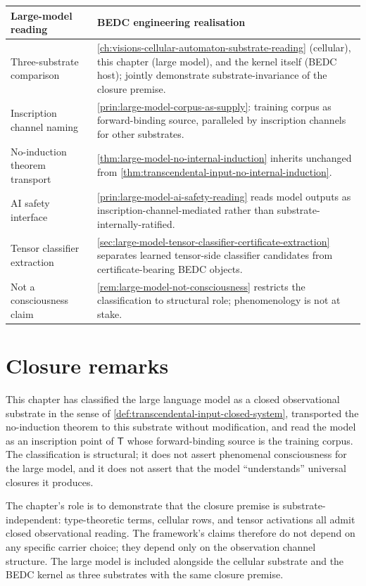 \begin{longtable}{p{}p{}}
\toprule
\textbf{Large-model reading} & \textbf{BEDC engineering realisation} \\
\midrule
Three-substrate comparison &
\autoref{ch:visions-cellular-automaton-substrate-reading} (cellular), this chapter (large model), and the kernel itself (BEDC host); jointly demonstrate substrate-invariance of the closure premise. \\
\midrule
Inscription channel naming &
\autoref{prin:large-model-corpus-as-supply}: training corpus as forward-binding source, paralleled by inscription channels for other substrates. \\
\midrule
No-induction theorem transport &
\autoref{thm:large-model-no-internal-induction} inherits unchanged from \autoref{thm:transcendental-input-no-internal-induction}. \\
\midrule
AI safety interface &
\autoref{prin:large-model-ai-safety-reading} reads model outputs as inscription-channel-mediated rather than substrate-internally-ratified. \\
\midrule
Tensor classifier extraction &
\autoref{sec:large-model-tensor-classifier-certificate-extraction} separates learned tensor-side classifier candidates from certificate-bearing BEDC objects. \\
\midrule
Not a consciousness claim &
\autoref{rem:large-model-not-consciousness} restricts the classification to structural role; phenomenology is not at stake. \\
\bottomrule
\end{longtable}

\section{Closure remarks}
\label{sec:large-model-closure}

This chapter has classified the large language model as a closed observational substrate in the sense of \autoref{def:transcendental-input-closed-system}, transported the no-induction theorem to this substrate without modification, and read the model as an inscription point of $\mathsf{T}$ whose forward-binding source is the training corpus. The classification is structural; it does not assert phenomenal consciousness for the large model, and it does not assert that the model ``understands'' universal closures it produces.

The chapter's role is to demonstrate that the closure premise is substrate-independent: type-theoretic terms, cellular rows, and tensor activations all admit closed observational reading. The framework's claims therefore do not depend on any specific carrier choice; they depend only on the observation channel structure. The large model is included alongside the cellular substrate and the BEDC kernel as three substrates with the same closure premise.


